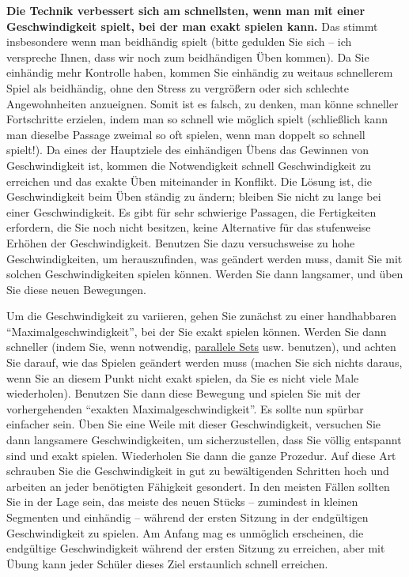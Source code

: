 \textbf{Die Technik verbessert sich am schnellsten, wenn man mit einer Geschwindigkeit spielt, bei der man exakt spielen kann.}
Das stimmt insbesondere wenn man beidhändig spielt (bitte gedulden Sie sich -- ich verspreche Ihnen, dass wir noch zum beidhändigen Üben kommen).
Da Sie einhändig mehr Kontrolle haben, kommen Sie einhändig zu weitaus schnellerem Spiel als beidhändig, ohne den Stress zu vergrößern oder sich schlechte Angewohnheiten anzueignen.
Somit ist es falsch, zu denken, man könne schneller Fortschritte erzielen, indem man so schnell wie möglich spielt (schließlich kann man dieselbe Passage zweimal so oft spielen, wenn man doppelt so schnell spielt!).
Da eines der Hauptziele des einhändigen Übens das Gewinnen von Geschwindigkeit ist, kommen die Notwendigkeit schnell Geschwindigkeit zu erreichen und das exakte Üben miteinander in Konflikt.
Die Lösung ist, die Geschwindigkeit beim Üben ständig zu ändern; bleiben Sie nicht zu lange bei einer Geschwindigkeit.
Es gibt für sehr schwierige Passagen, die Fertigkeiten erfordern, die Sie noch nicht besitzen, keine Alternative für das stufenweise Erhöhen der Geschwindigkeit.
Benutzen Sie dazu versuchsweise zu hohe Geschwindigkeiten, um herauszufinden, was geändert werden muss, damit Sie mit solchen Geschwindigkeiten spielen können.
Werden Sie dann langsamer, und üben Sie diese neuen Bewegungen.

Um die Geschwindigkeit zu variieren, gehen Sie zunächst zu einer handhabbaren \enquote{Maximalgeschwindigkeit}, bei der Sie exakt spielen können.
Werden Sie dann schneller (indem Sie, wenn notwendig, \hyperref[c1ii11]{parallele Sets} usw. benutzen), und achten Sie darauf, wie das Spielen geändert werden muss (machen Sie sich nichts daraus, wenn Sie an diesem Punkt nicht exakt spielen, da Sie es nicht viele Male wiederholen).
Benutzen Sie dann diese Bewegung und spielen Sie mit der vorhergehenden \enquote{exakten Maximalgeschwindigkeit}.
Es sollte nun spürbar einfacher sein.
Üben Sie eine Weile mit dieser Geschwindigkeit, versuchen Sie dann langsamere Geschwindigkeiten, um sicherzustellen, dass Sie völlig entspannt sind und exakt spielen.
Wiederholen Sie dann die ganze Prozedur.
Auf diese Art schrauben Sie die Geschwindigkeit in gut zu bewältigenden Schritten hoch und arbeiten an jeder benötigten Fähigkeit gesondert.
In den meisten Fällen sollten Sie in der Lage sein, das meiste des neuen Stücks -- zumindest in kleinen Segmenten und einhändig -- während der ersten Sitzung in der endgültigen Geschwindigkeit zu spielen.
Am Anfang mag es unmöglich erscheinen, die endgültige Geschwindigkeit während der ersten Sitzung zu erreichen, aber mit Übung kann jeder Schüler dieses Ziel erstaunlich schnell erreichen.
 

